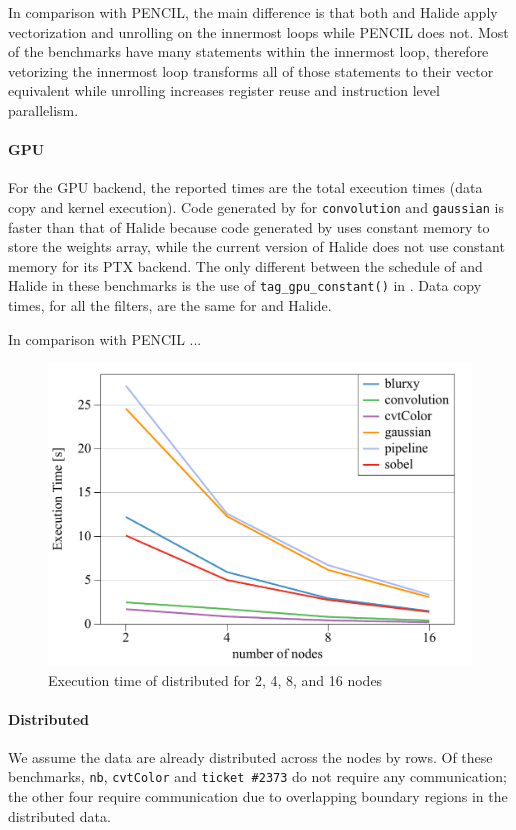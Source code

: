 In comparison with PENCIL, the main difference is that both \framework{} and Halide apply vectorization and unrolling on the innermost loops while PENCIL does not.  Most of the benchmarks have many statements within the innermost loop, therefore vetorizing the innermost loop transforms all of those statements to their vector equivalent while unrolling increases register reuse and instruction level parallelism.

\paragraph{GPU}
For the GPU backend, the reported times are the total execution times (data copy and kernel execution).
Code generated by \framework{} for \texttt{convolution} and \texttt{gaussian} is faster than that of Halide because code generated by \framework{} uses constant memory to store the weights array, while the current version of Halide does not use constant memory for its PTX backend.  The only different between the schedule of \framework{} and Halide in these benchmarks is the use of \texttt{tag\_gpu\_constant()} in \framework{}.  Data copy times, for all the filters,  are the same for \framework{} and Halide.

In comparison with PENCIL ...

\begin{figure}[t]
\centering
\includegraphics[width=0.6\columnwidth, trim=0 30 0 60]{./figures/tiramisudist}
\caption{Execution time of distributed \framework{} for 2, 4, 8, and 16 nodes}
\label{fig:distCPU_tiramisu_scaling_exec}
\end{figure}

\paragraph{Distributed}
We assume the data are already distributed across the nodes by rows. Of these benchmarks, \texttt{nb}, \texttt{cvtColor} and \texttt{ticket \#2373} do not require any communication; the other four require communication due to overlapping boundary regions in the distributed data.

